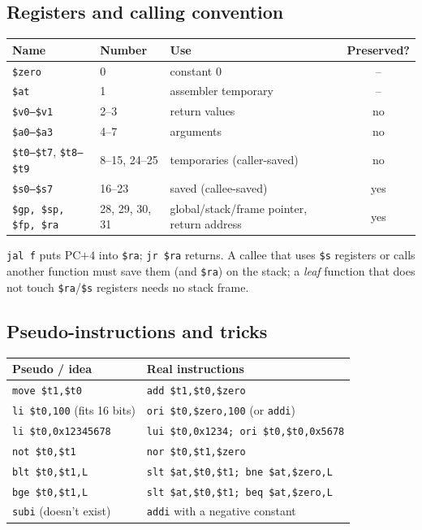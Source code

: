 \documentclass[11pt]{article}
\begin{document}
\subsection{Registers and calling convention}
\begin{center}
\small
\begin{tabular}{@{}llp{5.2cm}c@{}}
\toprule
Name & Number & Use & Preserved? \\
\midrule
\texttt{\$zero} & 0 & constant 0 & -- \\
\texttt{\$at} & 1 & assembler temporary & -- \\
\texttt{\$v0--\$v1} & 2--3 & return values & no \\
\texttt{\$a0--\$a3} & 4--7 & arguments & no \\
\texttt{\$t0--\$t7}, \texttt{\$t8--\$t9} & 8--15, 24--25 & temporaries (caller-saved) & no \\
\texttt{\$s0--\$s7} & 16--23 & saved (callee-saved) & yes \\
\texttt{\$gp, \$sp, \$fp, \$ra} & 28, 29, 30, 31 & global/stack/frame pointer, return address & yes \\
\bottomrule
\end{tabular}
\end{center}
\begin{note}
\texttt{jal f} puts PC$+4$ into \texttt{\$ra}; \texttt{jr \$ra} returns. A
callee that uses \texttt{\$s} registers or calls another function must save
them (and \texttt{\$ra}) on the stack; a \emph{leaf} function that does not
touch \texttt{\$ra}/\texttt{\$s} registers needs no stack frame.
\end{note}

\subsection{Pseudo-instructions and tricks}
\begin{center}
\small
\begin{tabular}{@{}ll@{}}
\toprule
Pseudo / idea & Real instructions \\
\midrule
\texttt{move \$t1,\$t0} & \texttt{add \$t1,\$t0,\$zero} \\
\texttt{li \$t0,100} (fits 16 bits) & \texttt{ori \$t0,\$zero,100} (or \texttt{addi}) \\
\texttt{li \$t0,0x12345678} & \texttt{lui \$t0,0x1234; ori \$t0,\$t0,0x5678} \\
\texttt{not \$t0,\$t1} & \texttt{nor \$t0,\$t1,\$zero} \\
\texttt{blt \$t0,\$t1,L} & \texttt{slt \$at,\$t0,\$t1; bne \$at,\$zero,L} \\
\texttt{bge \$t0,\$t1,L} & \texttt{slt \$at,\$t0,\$t1; beq \$at,\$zero,L} \\
\texttt{subi} (doesn't exist) & \texttt{addi} with a negative constant \\
\bottomrule
\end{tabular}
\end{center}
\end{document}
